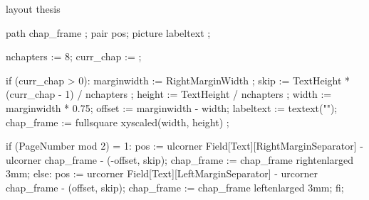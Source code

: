 \startenvironment layout
\product thesis


\usemodule[units]
\usemodule[bibtex]



\setupinteraction[state=start]
\setuppapersize[ThesisSize]
\setuplayout[location=middle, width=13.0cm, height=22cm, 
             topspace=1.0cm, bottomspace=1.0cm, margin=2.0cm, 
             header=1.0cm, footer=1.0cm]

{}

\setuppagenumbering[alternative=doublesided, location=right]


\definecolor[tableheadcolor][darkgray]
\definecolor[tableoddrow][gray]
\definecolor[thumbindexcolor][darkgray]
\definecolor[thumbindexfontcolor][white]


    path chap_frame ;
    pair pos;  
    picture labeltext ;
  
    nchapters := 8;
    curr_chap :=  ; 
  
    if (curr_chap > 0):
           marginwidth := RightMarginWidth ;
           skip   := TextHeight * (curr_chap - 1) / nchapters ;
           height := TextHeight / nchapters ;
           width  := marginwidth * 0.75;
           offset := marginwidth - width;
           labeltext := textext("\ssbfd \thumbindexfontcolor \getmarking[chapternumber]");
           chap_frame := fullsquare xyscaled(width, height) ;

           if (PageNumber mod 2) = 1:
               pos := ulcorner Field[Text][RightMarginSeparator] -
                      ulcorner chap_frame - (-offset, skip);
               chap_frame := chap_frame rightenlarged 3mm;
           else:
               pos := urcorner Field[Text][LeftMarginSeparator] -
                      urcorner chap_frame - (offset, skip);
               chap_frame := chap_frame leftenlarged 3mm;
           fi;

